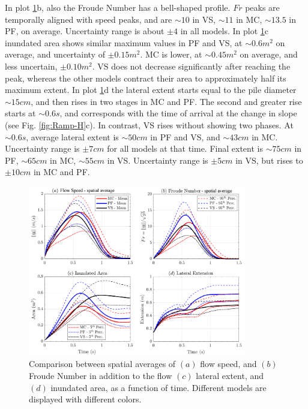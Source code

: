 \documentclass{article}
\begin{document}
In plot \ref{fig:Ramp-spatial}b, also the Froude Number has a bell-shaped profile. $Fr$ peaks are temporally aligned with speed peaks, and are $\sim 10$ in VS, $\sim 11$ in MC, $\sim 13.5$ in PF, on average. Uncertainty range is about $\pm 4$ in all models. In plot \ref{fig:Ramp-spatial}c inundated area shows similar maximum values in PF and VS, at $\sim 0.6 m^2$ on average, and uncertainty of $\pm 0.15 m^2$. MC is lower, at $\sim 0.45 m^2$ on average, and less uncertain, $\pm 0.10 m^2$. VS does not decrease significantly after reaching the peak, whereas the other models contract their area to approximately half its maximum extent. In plot \ref{fig:Ramp-spatial}d the lateral extent starts equal to the pile diameter $\sim 15 cm$, and then rises in two stages in MC and PF. The second and greater rise starts at $\sim 0.6 s$, and corresponds with the time of arrival at the change in slope (see Fig. \ref{fig:Ramp-H}c). In contrast, VS rises without showing two phases. At $\sim 0.6 s$, average lateral extent is $\sim 50 cm$ in PF and VS, and $\sim 43 cm$ in MC. Uncertainty range is $\pm 7 cm$ for all models at that time. Final extent is $\sim 75 cm$ in PF, $\sim 65 cm$ in MC, $\sim 55 cm$ in VS. Uncertainty range is $\pm 5 cm$ in VS, but rises to $\pm 10 cm$ in MC and PF.
\begin{figure}[H]
        \centering
        \includegraphics[width=0.85\textwidth]{figures/incline/AveragedIncline.png}
        \caption{Comparison between spatial averages of $(a)$ flow speed, and $(b)$ Froude Number in addition to the flow $(c)$ lateral extent, and $(d)$ inundated area, as a function of time. Different models are displayed with different colors.}
        \label{fig:Ramp-spatial}
\end{figure}
\end{document}
